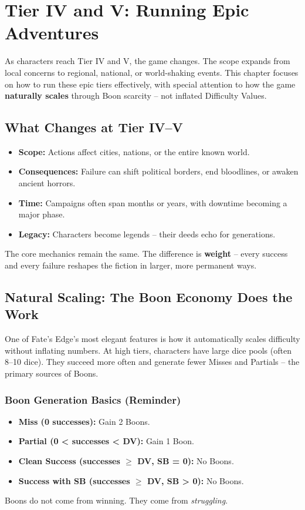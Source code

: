 \chapter{Tier IV and V: Running Epic Adventures}
\label{ch:gm-epic}

As characters reach Tier IV and V, the game changes. The scope expands from local concerns to regional, national, or world-shaking events. This chapter focuses on how to run these epic tiers effectively, with special attention to how the game \textbf{naturally scales} through Boon scarcity -- not inflated Difficulty Values.

\section{What Changes at Tier IV--V}

\begin{itemize}
  \item \textbf{Scope:} Actions affect cities, nations, or the entire known world.
  \item \textbf{Consequences:} Failure can shift political borders, end bloodlines, or awaken ancient horrors.
  \item \textbf{Time:} Campaigns often span months or years, with downtime becoming a major phase.
  \item \textbf{Legacy:} Characters become legends -- their deeds echo for generations.
\end{itemize}

The core mechanics remain the same. The difference is \textbf{weight} -- every success and every failure reshapes the fiction in larger, more permanent ways.

\section{Natural Scaling: The Boon Economy Does the Work}

One of Fate's Edge's most elegant features is how it automatically scales difficulty without inflating numbers. At high tiers, characters have large dice pools (often 8--10 dice). They succeed more often and generate fewer Misses and Partials -- the primary sources of Boons.

\subsection*{Boon Generation Basics (Reminder)}
\begin{itemize}
  \item \textbf{Miss (0 successes):} Gain 2 Boons.
  \item \textbf{Partial (0 < successes < DV):} Gain 1 Boon.
  \item \textbf{Clean Success (successes $\geq$ DV, SB = 0):} No Boons.
  \item \textbf{Success with SB (successes $\geq$ DV, SB > 0):} No Boons.
\end{itemize}
Boons do not come from winning. They come from \textit{struggling}.


